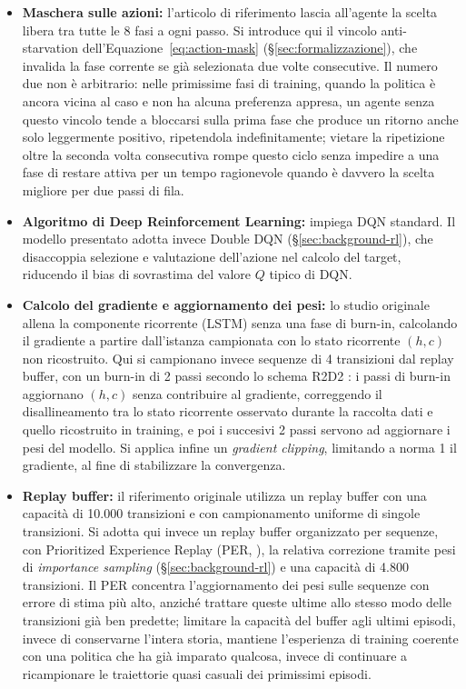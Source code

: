 \begin{itemize}
  \item \textbf{Maschera sulle azioni:} l'articolo di riferimento lascia all'agente la scelta libera tra tutte le 8 fasi a ogni passo. Si introduce qui il vincolo anti-starvation dell'Equazione~\ref{eq:action-mask} (§\ref{sec:formalizzazione}), che invalida la fase corrente se già selezionata due volte consecutive. Il numero due non è arbitrario: nelle primissime fasi di training, quando la politica è ancora vicina al caso e non ha alcuna preferenza appresa, un agente senza questo vincolo tende a bloccarsi sulla prima fase che produce un ritorno anche solo leggermente positivo, ripetendola indefinitamente; vietare la ripetizione oltre la seconda volta consecutiva rompe questo ciclo senza impedire a una fase di restare attiva per un tempo ragionevole quando è davvero la scelta migliore per due passi di fila.

  \item \textbf{Algoritmo di Deep Reinforcement Learning:} \citet{wang2022metastgat} impiega DQN standard. Il modello presentato adotta invece Double DQN \citep{vanhasselt2016double} (§\ref{sec:background-rl}), che disaccoppia selezione e valutazione dell'azione nel calcolo del target, riducendo il bias di sovrastima del valore $Q$ tipico di DQN.

  \item \textbf{Calcolo del gradiente e aggiornamento dei pesi:} lo studio originale allena la componente ricorrente (LSTM) senza una fase di burn-in, calcolando il gradiente a partire dall'istanza campionata con lo stato ricorrente $(h,c)$ non ricostruito. Qui si campionano invece sequenze di 4 transizioni dal replay buffer, con un burn-in di 2 passi secondo lo schema R2D2 \citep{kapturowski2019r2d2}: i passi di burn-in aggiornano $(h,c)$ senza contribuire al gradiente, correggendo il disallineamento tra lo stato ricorrente osservato durante la raccolta dati e quello ricostruito in training, e poi i succesivi 2 passi servono ad aggiornare i pesi del modello. Si applica infine un \emph{gradient clipping}, limitando a norma 1 il gradiente, al fine di stabilizzare la convergenza.

  \item \textbf{Replay buffer:} il riferimento originale utilizza un replay buffer con una capacità di 10.000 transizioni e con campionamento uniforme di singole transizioni. Si adotta qui invece un replay buffer organizzato per sequenze, con Prioritized Experience Replay (PER, \citealp{schaul2016per}), la relativa correzione tramite pesi di \emph{importance sampling} (§\ref{sec:background-rl}) e una capacità di 4.800 transizioni. Il PER concentra l'aggiornamento dei pesi sulle sequenze con errore di stima più alto, anziché trattare queste ultime allo stesso modo delle transizioni già ben predette; limitare la capacità del buffer agli ultimi episodi, invece di conservarne l'intera storia, mantiene l'esperienza di training coerente con una politica che ha già imparato qualcosa, invece di continuare a ricampionare le traiettorie quasi casuali dei primissimi episodi.


\end{itemize}

